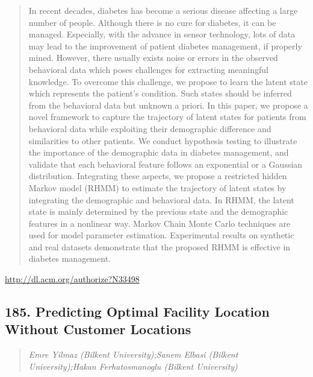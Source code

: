 \documentclass{article}
\begin{document}
\begin{quote}
In recent decades, diabetes has become a serious disease affecting a large number of people. Although there is no cure for diabetes, it can be managed. Especially, with the advance in sensor technology, lots of data may lead to the improvement of patient diabetes management, if properly mined. However, there usually exists noise or errors in the observed behavioral data which poses challenges for extracting meaningful knowledge. To overcome this challenge, we propose to learn the latent state which represents the patient’s condition. Such states should be inferred from the behavioral data but unknown a priori. In this paper, we propose a novel framework to capture the trajectory of latent states for patients from behavioral data while exploiting their demographic difference and similarities to other patients. We conduct hypothesis testing to illustrate the importance of the demographic data in diabetes management, and validate that each behavioral feature follows an exponential or a Gaussian distribution. Integrating these aspects, we propose a restricted hidden Markov model (RHMM) to estimate the trajectory of latent states by integrating the demographic and behavioral data. In RHMM, the latent state is mainly determined by the previous state and the demographic features in a nonlinear way. Markov Chain Monte Carlo techniques are used for model parameter estimation. Experimental results on synthetic and real datasets demonstrate that the proposed RHMM is effective in diabetes management.
\end{quote}

\href{http://dl.acm.org/authorize?N33498}{http://dl.acm.org/authorize?N33498}

\subsection{185. Predicting Optimal Facility Location Without Customer Locations}

\begin{quote}
\footnotesize{\textit{Emre Yilmaz (Bilkent University);Sanem Elbasi (Bilkent University);Hakan Ferhatosmanoglu (Bilkent University)}}

\end{quote}
\end{document}
